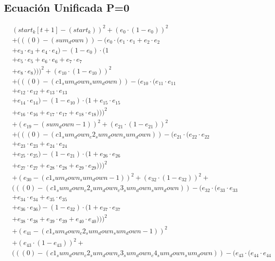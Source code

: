 \documentclass[10pt, a4paper]{article}
\begin{document}
\subsection*{Ecuación Unificada P=0}
\begin{align*}
& (start_k[t+1] - (start_k))^{2} + (e_{0} \cdot (1 - e_{0}))^{2} \\
& + (((0) - (sum_down)) - (e_{0} \cdot (e_{1} \cdot e_{1} + e_{2} \cdot e_{2} \\
& + e_{3} \cdot e_{3} + e_{4} \cdot e_{4}) - (1 - e_{0}) \cdot (1 \\
& + e_{5} \cdot e_{5} + e_{6} \cdot e_{6} + e_{7} \cdot e_{7} \\
& + e_{8} \cdot e_{8})))^{2} + (e_{10} \cdot (1 - e_{10}))^{2} \\
& + (((0) - (c1_sum_down_sum_down)) - (e_{10} \cdot (e_{11} \cdot e_{11} \\
& + e_{12} \cdot e_{12} + e_{13} \cdot e_{13} \\
& + e_{14} \cdot e_{14}) - (1 - e_{10}) \cdot (1 + e_{15} \cdot e_{15} \\
& + e_{16} \cdot e_{16} + e_{17} \cdot e_{17} + e_{18} \cdot e_{18})))^{2} \\
& + (e_{19} - (sum_down - 1))^{2} + (e_{21} \cdot (1 - e_{21}))^{2} \\
& + (((0) - (c1_sum_down_c2_sum_down_sum_down)) - (e_{21} \cdot (e_{22} \cdot e_{22} \\
& + e_{23} \cdot e_{23} + e_{24} \cdot e_{24} \\
& + e_{25} \cdot e_{25}) - (1 - e_{21}) \cdot (1 + e_{26} \cdot e_{26} \\
& + e_{27} \cdot e_{27} + e_{28} \cdot e_{28} + e_{29} \cdot e_{29})))^{2} \\
& + (e_{30} - (c1_sum_down_sum_down - 1))^{2} + (e_{32} \cdot (1 - e_{32}))^{2} + \\
& (((0) - (c1_sum_down_c2_sum_down_c3_sum_down_sum_down)) - (e_{32} \cdot (e_{33} \cdot e_{33} \\
& + e_{34} \cdot e_{34} + e_{35} \cdot e_{35} \\
& + e_{36} \cdot e_{36}) - (1 - e_{32}) \cdot (1 + e_{37} \cdot e_{37} \\
& + e_{38} \cdot e_{38} + e_{39} \cdot e_{39} + e_{40} \cdot e_{40})))^{2} \\
& + (e_{41} - (c1_sum_down_c2_sum_down_sum_down - 1))^{2} \\
& + (e_{43} \cdot (1 - e_{43}))^{2} + \\
& (((0) - (c1_sum_down_c2_sum_down_c3_sum_down_c4_sum_down_sum_down)) - (e_{43} \cdot (e_{44} \cdot e_{44} \\

\end{align*}
\end{document}
